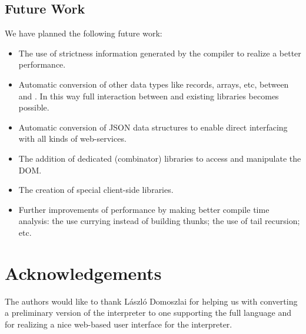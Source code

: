\subsection{Future Work}
We have planned the following future work:
\begin{itemize}
\item The use of strictness information generated by the \Clean compiler to realize a better performance.
\item Automatic conversion of other data types like records, arrays, etc, between \Sapl and \JS. 
In this way full interaction between \Sapl and existing \JS libraries becomes possible.
\item Automatic conversion of \textsf{JSON} data structures  to enable direct interfacing with all kinds of web-services. 
\item The addition of dedicated (combinator) libraries to access and manipulate the \Html \textsf{DOM}.
\item The creation of special client-side \iTask libraries.
\item Further improvements of performance by making better compile time analysis: the use \JS currying instead of building thunks;
the use of tail recursion; etc.
\end{itemize}

\section*{Acknowledgements}
The authors would like to thank L\'aszl\'o Domoszlai for helping us with converting a preliminary version of the interpreter to one supporting the full \Sapl language and
for realizing a nice web-based user interface for the interpreter.

